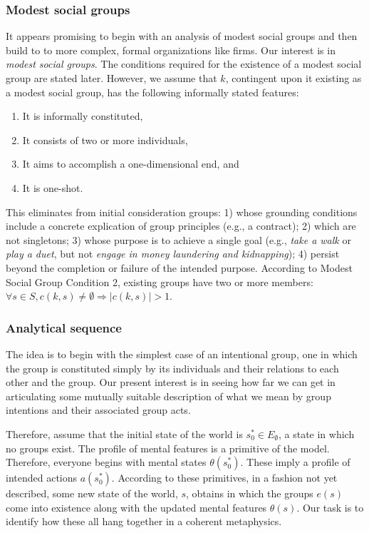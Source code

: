 \documentclass[
11pt,
titlepage,
reqno,
]{article}%
\theoremstyle{definition}
\begin{document}
	\subsubsection{Modest social groups} 
	It appears promising to begin with an analysis of modest social groups and then build to to more complex, formal organizations like firms.  Our interest is in \textit{modest social groups}. The conditions required for the existence of a modest social group are stated later. However, we assume that $k$, contingent upon it existing as a modest social group, has the following informally stated features:
	\begin{enumerate}
		\item It is informally constituted,  
		\item It consists of two or more individuals, 
		\item It aims to accomplish a one-dimensional end, and 
		\item It is one-shot.
	\end{enumerate}
	This eliminates from initial consideration groups: 1) whose grounding conditions include a concrete explication of group principles (e.g., a contract); 2) which are not singletons; 3) whose purpose is to achieve a single goal (e.g., \textit{take a walk} or \textit{play a duet}, but not \textit{engage in money laundering and kidnapping}); 4) persist beyond the completion or failure of the intended purpose. According to Modest Social Group Condition 2, existing groups have two or more members:  $\forall s\in S, c(k,s)\ne\emptyset\Rightarrow |c(k,s)|>1$.  
	
	\subsubsection{Analytical sequence}
	The idea is to begin with the simplest case of an intentional group, one in which the group is constituted  simply by its individuals and their relations to each other and the group. Our present interest is in seeing how far we can get in articulating some mutually suitable description of what we mean by group intentions and their associated group acts. 
	
	Therefore, assume that the initial state of the world is $s_0^\ast\in E_\emptyset$, a state in which no groups exist. The profile of mental features is a primitive of the model. Therefore, everyone begins with mental states $\theta(s_0^\ast)$. These imply a profile of intended actions $a(s_0^\ast)$. According to these primitives, in a fashion not yet described, some new state of the world, $s$, obtains in which the groups $e(s)$ come into existence along with the updated mental features $\theta(s)$.  Our task is to identify how these all hang together in a coherent metaphysics.
	
\end{document}
